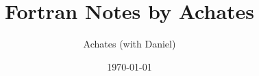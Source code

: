 \documentclass[10pt]{book}
\begin{document}
\frontmatter

\title{Fortran Notes by Achates}
\author{Achates (with Daniel)}
\date{\today}
\maketitle

	
\tableofcontents

\mainmatter
	
	
	

\printbibliography
\end{document}
